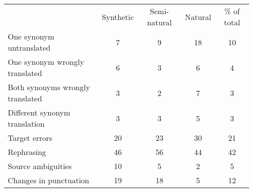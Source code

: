 \begin{tabular}{lcccc}
 & Synthetic & Semi-natural & Natural & \% of total \\
One synonym untranslated & 7 & 9 & 18 & 10\\
One synonym wrongly translated & 6 & 3 & 6 & 4\\
Both synonyms wrongly translated & 3 & 2 & 7 & 3\\
Different synonym translation & 3 & 3 & 5 & 3\\\hline
Target errors & 20 & 23 & 30 & 21\\
Rephrasing & 46 & 56 & 44 & 42\\
Source ambiguities & 10 & 5 & 2 & 5\\
Changes in punctuation & 19 & 18 & 5 & 12\\
\end{tabular}